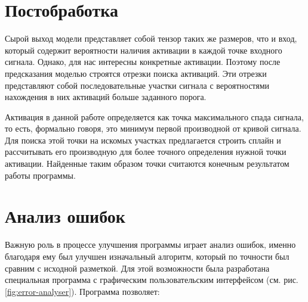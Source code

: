 \section{Постобработка}
Сырой выход модели представляет собой тензор таких же размеров, что и вход,
который содержит вероятности наличия активации в каждой точке входного сигнала.
Однако, для нас интересны конкретные активации. Поэтому после предсказания
моделью строятся отрезки поиска активаций. Эти отрезки представляют собой
последовательные участки сигнала с вероятностями нахождения в них активаций
больше заданного порога.

Активация в данной работе определяется как точка максимального спада сигнала,
то есть, формально говоря, это минимум первой производной от кривой сигнала.
Для поиска этой точки на искомых участках предлагается строить сплайн и
рассчитывать его производную для более точного определения нужной точки
активации. Найденные таким образом точки считаются конечным результатом работы
программы.

\section{Анализ ошибок}

Важную роль в процессе улучшения программы играет анализ ошибок, именно
благодаря ему был улучшен изначальный алгоритм, который по точности был сравним
с исходной разметкой. Для этой возможности была разработана специальная
программа с графическим пользовательским интерфейсом (см. рис.
\ref{fig:error-analyser}). Программа позволяет:

